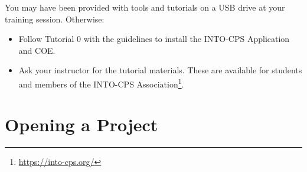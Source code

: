 \documentclass[11pt,a4paper]{../tutorial}
\begin{document}
You may have been provided with tools and tutorials on a USB drive at your training session. Otherwise: 
\begin{itemize}[noitemsep]
\item Follow Tutorial 0 with the guidelines to install the INTO-CPS Application and COE.
\item Ask your instructor for the tutorial materials. These are available for students and members of the INTO-CPS Association\footnote{\url{https://into-cps.org/}}.
\end{itemize}



\newpage

\section{Opening a Project}
\end{document}
